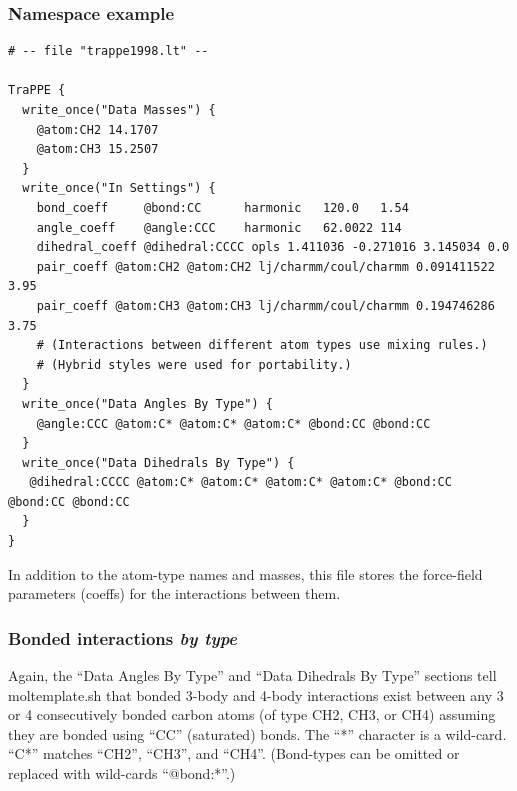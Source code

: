 \documentclass[11pt]{article}
\begin{document}
\subsubsection{Namespace example}
\label{sec:trappe}
\begin{verbatim}
# -- file "trappe1998.lt" --

TraPPE {
  write_once("Data Masses") {
    @atom:CH2 14.1707
    @atom:CH3 15.2507
  }
  write_once("In Settings") {
    bond_coeff     @bond:CC      harmonic   120.0   1.54
    angle_coeff    @angle:CCC    harmonic   62.0022 114
    dihedral_coeff @dihedral:CCCC opls 1.411036 -0.271016 3.145034 0.0
    pair_coeff @atom:CH2 @atom:CH2 lj/charmm/coul/charmm 0.091411522 3.95
    pair_coeff @atom:CH3 @atom:CH3 lj/charmm/coul/charmm 0.194746286 3.75
    # (Interactions between different atom types use mixing rules.)
    # (Hybrid styles were used for portability.)
  }
  write_once("Data Angles By Type") {
    @angle:CCC @atom:C* @atom:C* @atom:C* @bond:CC @bond:CC
  }
  write_once("Data Dihedrals By Type") {
   @dihedral:CCCC @atom:C* @atom:C* @atom:C* @atom:C* @bond:CC @bond:CC @bond:CC
  }
}
\end{verbatim}
In addition to the atom-type names and masses, 
this file stores the force-field parameters (coeffs) for the 
interactions between them.

\subsubsection*{Bonded interactions \textit{by type}}
Again, the ``Data Angles By Type'' and ``Data Dihedrals By Type'' sections 
tell moltemplate.sh that bonded 3-body and 4-body interactions exist between
any 3 or 4 consecutively bonded carbon atoms (of type CH2, CH3, or CH4)
assuming they are bonded using ``CC'' (saturated) bonds.
The ``*'' character is a wild-card.
``C*'' matches ``CH2'', ``CH3'', and ``CH4''.
(Bond-types can be omitted or replaced with wild-cards ``@bond:*''.)

%
\end{document}
